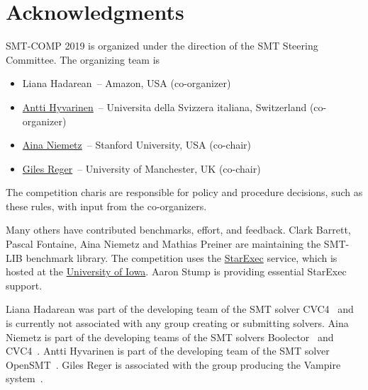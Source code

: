 \documentclass[12pt]{article}
\begin{document}
\section{Acknowledgments}

SMT-COMP 2019 is organized under the direction of the SMT Steering
Committee. The organizing team is
%
\begin{itemize}
\setlength{\itemsep}{0pt}
\item
		Liana Hadarean~-- Amazon, USA (co-organizer)
\item \href{http://www.inf.usi.ch/postdoc/hyvarinen/}{Antti Hyvarinen}~--
		Universita della Svizzera italiana, Switzerland (co-organizer)
\item
  \href{http://cs.stanford.edu/people/niemetz}{Aina
    Niemetz}~-- Stanford University, USA (co-chair)
\item \href{http://www.cs.man.ac.uk/~regerg/}{Giles Reger}~--
  University of Manchester, UK (co-chair)
\end{itemize}
%
The competition charis are responsible for policy and procedure decisions,
such as these rules, with input from the co-organizers.

Many others have contributed benchmarks, effort, and feedback.  Clark Barrett,
Pascal Fontaine, Aina Niemetz and Mathias Preiner are maintaining the SMT-LIB
benchmark library.
The competition uses the
\href{https://www.starexec.org/}{StarExec} service, which is hosted at
the \href{http://www.cs.uiowa.edu/}{University of Iowa}.  Aaron Stump
is providing essential StarExec support.

%
Liana Hadarean was part of the developing team of the SMT solver
CVC4~\cite{cvc4} and is currently not associated with any group
creating or submitting solvers.
Aina Niemetz is part of the developing teams of the SMT solvers
Boolector~\cite{boolector}
and CVC4~\cite{cvc4}.
Antti Hyvarinen is part of the developing team of the SMT solver
OpenSMT~\cite{opensmt2}.
Giles Reger is associated with the group
producing the Vampire system~\cite{vampire}.





\end{document}

